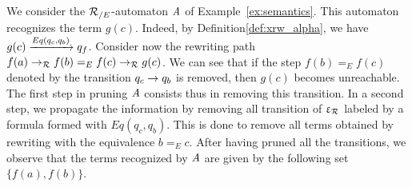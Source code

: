 \begin{example}
  \label{ex:pruning}
  We consider the ${\mathcal R_{/E}}$-automaton $\mathit A$ of Example~\ref{ex:semantics}.
  This automaton recognizes the term $g(c)$. Indeed, by
  Definition\ref{def:xrw_alpha}, we have $g(c) \xrightarrow{Eq(q_c, q_b)}
  q_f$. Consider now the rewriting path $f(a) \rightarrow_\mathcal R f(b) =_E f(c)
  \rightarrow_\mathcal R g(c)$. We can see that if the step $f(b) =_E f(c)$ denoted by
  the transition $q_c \rightarrow q_b$ is removed, then $g(c)$ becomes
  unreachable. The first step in pruning $\mathit A$ consists thus in
  removing this transition. In a second step, we propagate the
  information by removing all transition of $\upvarepsilon_{\mathcal R}$ labeled by a
  formula formed with $Eq(q_c, q_b)$. This is done to remove all terms
  obtained by rewriting with the equivalence $b =_E c$. After having
  pruned all the transitions, we observe that the terms recognized by
  $\mathit A$ are given by the following set $\{f(a), f(b)\}$.
\end{example}







